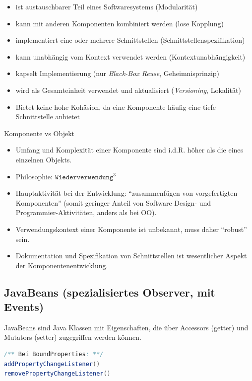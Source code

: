 \documentclass[a4paper,fontsize=9pt, DIV=calc]{scrartcl}
\begin{document}
\begin{multicols}{2}
\begin{multicols}{2}
\begin{itemize}[leftmargin=*]\itemsep-2mm
    \item ist austauschbarer Teil eines Softwaresystems (Modularität)
    \item kann mit anderen Komponenten kombiniert werden (lose Kopplung)
    \item implementiert eine oder mehrere Schnittstellen (Schnittstellenspezifikation)
    \item kann unabhängig vom Kontext verwendet werden (Kontextunabhängigkeit)
    \item kapselt Implementierung (nur \textit{Black-Box Reuse}, Geheimnisprinzip)
    \item wird als Gesamteinheit verwendet und aktualisiert (\textit{Versioning}, Lokalität)
		\item Bietet keine hohe Kohäsion, da eine Komponente häufig eine tiefe Schnittstelle anbietet
 \end{itemize}
Komponente vs Objekt
\begin{itemize}[leftmargin=*]\itemsep-2mm
	\item Umfang und Komplexität einer Komponente sind i.d.R. höher als die eines einzelnen Objekts.
	\item Philosophie: $\texttt{Wiederverwendung}^3$
	\item Hauptaktivität bei der Entwicklung: "`zusammenfügen von vorgefertigten Komponenten"' (somit geringer Anteil von Software Design- und Programmier-Aktivitäten, anders als bei OO).
	\item Verwendungskontext einer Komponente ist unbekannt, muss daher "`robust"' sein.
	\item Dokumentation und Spezifikation von Schnittstellen ist wesentlicher Aspekt der Komponentenentwicklung.
\end{itemize}

\end{multicols}


\subsection[JavaBeans]{JavaBeans (spezialisiertes Observer, mit Events)}
\begin{minipage}{0.48\columnwidth}
JavaBeans sind Java Klassen mit Eigenschaften, die über Accessors (getter) und Mutators (setter) zugegriffen werden können.
\end{minipage}\hfill%
\begin{minipage}{0.5\columnwidth}
\begin{lstlisting}[style=siemens, language=Java]
/** Bei BoundProperties: **/
addPropertyChangeListener()
removePropertyChangeListener()
\end{lstlisting}
\end{minipage}


\end{multicols}
\end{document}
